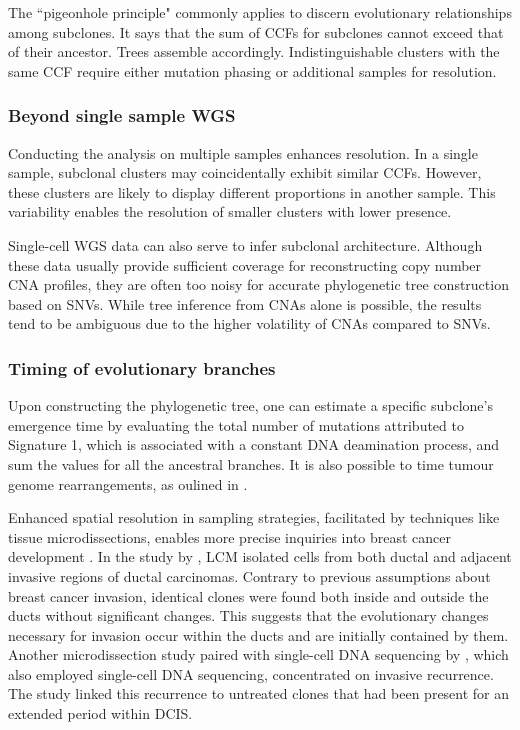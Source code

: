 {    The ``pigeonhole principle" commonly applies to discern evolutionary relationships among subclones. It says that the sum of \acp{CCF} for subclones cannot exceed that of their ancestor. Trees assemble accordingly. Indistinguishable clusters with the same \ac{CCF} require either mutation phasing or additional samples for resolution. 

    \subsubsection*{Beyond single sample \ac{WGS}}

    Conducting the analysis on multiple samples enhances resolution. In a single sample, subclonal clusters may coincidentally exhibit similar \acp{CCF}. However, these clusters are likely to display different proportions in another sample. This variability enables the resolution of smaller clusters with lower presence.

    Single-cell \ac{WGS} data can also serve to infer subclonal architecture. Although these data usually provide sufficient coverage for reconstructing copy number \ac{CNA} profiles, they are often too noisy for accurate phylogenetic tree construction based on \acp{SNV}. While tree inference from \acp{CNA} alone is possible, the results tend to be ambiguous due to the higher volatility of \acp{CNA} compared to \acp{SNV}.

    \subsubsection*{Timing of evolutionary branches}
    Upon constructing the phylogenetic tree, one can estimate a specific subclone's emergence time by evaluating the total number of mutations attributed to Signature 1, which is associated with a constant DNA deamination process, and sum the values for all the ancestral branches. It is also possible to time tumour genome rearrangements, as oulined in \textcite{Gerstung2020-sg}.
    }

Enhanced spatial resolution in sampling strategies, facilitated by techniques like tissue microdissections, enables more precise inquiries into breast cancer development . In the study by \textcite{Casasent2018-gx}, \ac{LCM} isolated cells from both ductal and adjacent invasive regions of ductal carcinomas. Contrary to previous assumptions about breast cancer invasion, identical clones were found both inside and outside the ducts without significant changes. This suggests that the evolutionary changes necessary for invasion occur within the ducts and are initially contained by them. Another microdissection study paired with single-cell DNA sequencing by \textcite{Lips2022-kv}, which also employed single-cell DNA sequencing, concentrated on invasive recurrence. The study linked this recurrence to untreated clones that had been present for an extended period within \ac{DCIS}.

